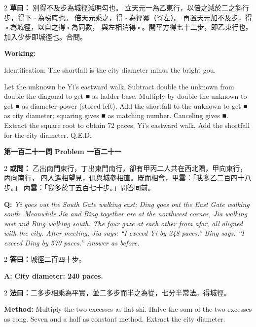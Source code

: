 \documentclass[11pt,a4paper]{article}
\let\origsquare\square
\renewcommand{\square}{\ensuremath{\origsquare}}%
\newcommand{\wen}[1]{%
  \par\vspace{0.5em}%
  \noindent\textcolor{problemcolor}{\textbf{第#1問}}%
  \hfill\textcolor{problemcolor}{\textbf{Problem #1}}\par\nopagebreak%
  \vspace{0.3em}%
}
\newcommand{\owen}[1]{%
  \noindent\textcolor{problemcolor}{\textbf{或問：}}{\tradfont #1}\par\nopagebreak%
}
\newcommand{\oweneng}[1]{%
  \noindent\textcolor{engcolor}{\textbf{Q: }}{\itshape #1}\par\nopagebreak%
}
\newcommand{\fayue}[1]{%
  \noindent\textcolor{methodcolor}{\textbf{法曰：}}{\tradfont #1}\par\nopagebreak%
}
\newcommand{\fayueeng}[1]{%
  \noindent\textcolor{engcolor}{\textbf{Method: }}{#1}\par\nopagebreak%
}
\newcommand{\tsaoyue}[1]{%
  \noindent\textcolor{workcolor}{\textbf{草曰：}}{\tradfont #1}\par%
}
\newcommand{\tsaoyueeng}[1]{%
  \noindent\textcolor{engcolor}{\textbf{Working: }}{\small #1}\par%
}
\newcommand{\dayue}[1]{%
  \noindent\textcolor{anscolor}{\textbf{答曰：}}{\tradfont #1}\par\nopagebreak%
}
\newcommand{\dayueeng}[1]{%
  \noindent\textcolor{engcolor}{\textbf{A: }}{\bfseries #1}\par\nopagebreak%
}
\begin{document}
\begin{paracol}{2}
\tsaoyue{%
別得不及步為城徑減明勾也。
立天元一為乙東行，以倍之減於二之斜行步，得下$ \; \square \; $為梯底也。
倍天元乘之，得$ \; \square \; $為徑冪（寄左）。
再置天元加不及步，得$ \; \square \; $為城徑，以自之得$ \; \square \; $為同數，
與左相消得$ \; \square \; $。開平方得七十二步，即乙東行也。加入少步即城徑也。合問。}
\switchcolumn
\tsaoyueeng{%
Identification: The shortfall is the city diameter minus the bright gou.

Let the unknown be Yi's eastward walk. Subtract double the unknown from double the diagonal to get ■ as ladder base. Multiply by double the unknown to get ■ as diameter-power (stored left). Add the shortfall to the unknown to get ■ as city diameter; squaring gives ■ as matching number. Canceling gives ■. Extract the square root to obtain 72 paces, Yi's eastward walk. Add the shortfall for the city diameter. Q.E.D.}
\end{paracol}

\vspace{0.5cm}

\wen{一百二十一}

\begin{paracol}{2}
\owen{%
乙出南門東行，丁出東門南行，卻有甲丙二人共在西北隅，甲向東行，丙向南行，
四人遙相望見，俱與城參相直。既而相會，甲雲：「我多乙二百四十八步。」
丙雲：「我多於丁五百七十步。」問答同前。}
\switchcolumn
\oweneng{%
Yi goes out the South Gate walking east; Ding goes out the East Gate walking south. Meanwhile Jia and Bing together are at the northwest corner, Jia walking east and Bing walking south. The four gaze at each other from afar, all aligned with the city. After meeting, Jia says: ``I exceed Yi by 248 paces.'' Bing says: ``I exceed Ding by 570 paces.'' Answer as before.}
\end{paracol}

\begin{paracol}{2}
\dayue{城徑二百四十步。}
\switchcolumn
\dayueeng{City diameter: 240 paces.}
\end{paracol}

\begin{paracol}{2}
\fayue{二多步相乘為平實，並二多步而半之為從，七分半常法。得城徑。}
\switchcolumn
\fayueeng{Multiply the two excesses as flat shi. Halve the sum of the two excesses as cong. Seven and a half as constant method. Extract the city diameter.}
\end{paracol}
\end{document}
